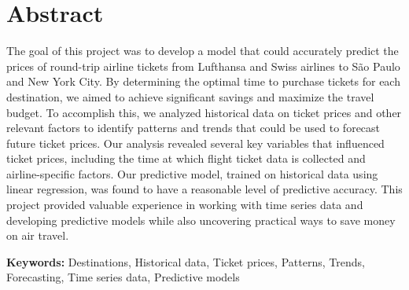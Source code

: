 \section*{Abstract}
The goal of this project was to develop a model that could accurately predict the prices of round-trip airline tickets from Lufthansa and Swiss airlines to São Paulo and New York City.
By determining the optimal time to purchase tickets for each destination, we aimed to achieve significant savings and maximize the travel budget. To accomplish this, we analyzed historical data on ticket prices and other relevant factors to identify patterns and trends that could be used to forecast future ticket prices.
Our analysis revealed several key variables that influenced ticket prices, including the time at which flight ticket data is collected and airline-specific factors. Our predictive model, trained on historical data using linear regression, was found to have a reasonable level of predictive accuracy.
This project provided valuable experience in working with time series data and developing predictive models while also uncovering practical ways to save money on air travel.
\vspace{.5cm}

\textbf{Keywords:} Destinations, Historical data, Ticket prices, Patterns, Trends, Forecasting, Time series data, Predictive models
\newpage